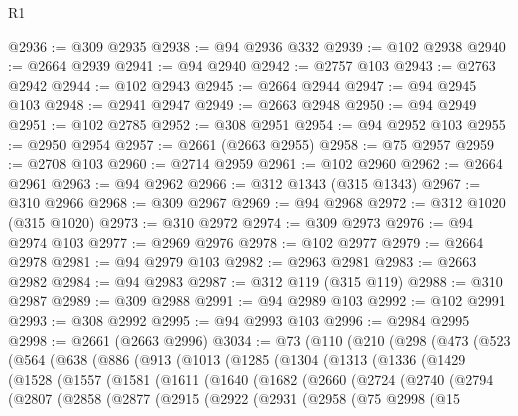 \begin{lexlean}{R1}
\begin{coremodule}
@2936 := @309 @2935
@2938 := @94 @2936 @332
@2939 := @102 @2938
@2940 := @2664 @2939
@2941 := @94 @2940
@2942 := @2757 @103
@2943 := @2763 @2942
@2944 := @102 @2943
@2945 := @2664 @2944
@2947 := @94 @2945 @103
@2948 := @2941 @2947
@2949 := @2663 @2948
@2950 := @94 @2949
@2951 := @102 @2785
@2952 := @308 @2951
@2954 := @94 @2952 @103
@2955 := @2950 @2954
@2957 := @2661 (@2663 @2955)
@2958 := @75 @2957
@2959 := @2708 @103
@2960 := @2714 @2959
@2961 := @102 @2960
@2962 := @2664 @2961
@2963 := @94 @2962
@2966 := @312 @1343 (@315 @1343)
@2967 := @310 @2966
@2968 := @309 @2967
@2969 := @94 @2968
@2972 := @312 @1020 (@315 @1020)
@2973 := @310 @2972
@2974 := @309 @2973
@2976 := @94 @2974 @103
@2977 := @2969 @2976
@2978 := @102 @2977
@2979 := @2664 @2978
@2981 := @94 @2979 @103
@2982 := @2963 @2981
@2983 := @2663 @2982
@2984 := @94 @2983
@2987 := @312 @119 (@315 @119)
@2988 := @310 @2987
@2989 := @309 @2988
@2991 := @94 @2989 @103
@2992 := @102 @2991
@2993 := @308 @2992
@2995 := @94 @2993 @103
@2996 := @2984 @2995
@2998 := @2661 (@2663 @2996)
@3034 := @73
    (@110
      (@210
        (@298
          (@473
            (@523
              (@564
                (@638
                  (@886
                    (@913
                      (@1013
                        (@1285
                          (@1304
                            (@1313
                              (@1336
                                (@1429
                                  (@1528
                                    (@1557
                                      (@1581
                                        (@1611
                                          (@1640
                                            (@1682
                                              (@2660
                                                (@2724
                                                  (@2740
                                                    (@2794
                                                      (@2807
                                                        (@2858
                                                          (@2877
                                                            (@2915
                                                              (@2922
                                                                (@2931
                                                                  (@2958
                                                                    (@75
                                                                      @2998
                                                                      (@15

\end{coremodule}
\end{lexlean}
